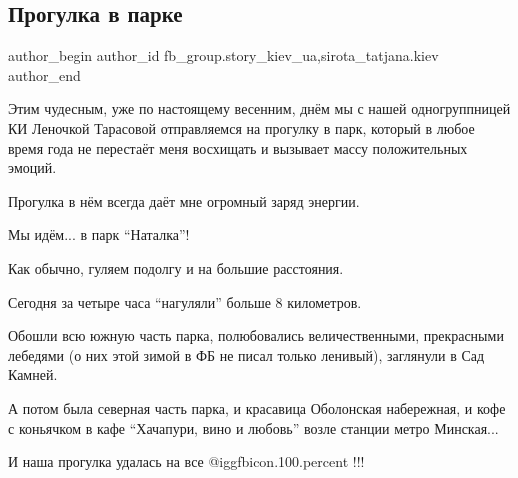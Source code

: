  
 
 
 
 
 
\subsection{Прогулка в парке}
\label{sec:21_02_2022.fb.fb_group.story_kiev_ua.2.progulka_v_parke}
 
\ifcmt
 author_begin
   author_id fb_group.story_kiev_ua,sirota_tatjana.kiev
 author_end
\fi

Этим чудесным, уже по настоящему весенним, днём мы с нашей одногруппницей КИ
Леночкой Тарасовой отправляемся на прогулку в парк, который в любое время года
не перестаёт меня восхищать и вызывает массу положительных эмоций.


Прогулка в нём всегда даёт мне огромный заряд энергии.

Мы идём... в парк \enquote{Наталка}!

Как обычно, гуляем подолгу и на большие расстояния.


Сегодня за четыре часа \enquote{нагуляли} больше 8 километров.


Обошли всю южную часть парка, полюбовались величественными, прекрасными
лебедями (о них этой зимой в ФБ не писал только ленивый), заглянули в Сад
Камней.


А потом была северная часть парка, и красавица Оболонская набережная, и кофе с
коньячком в кафе \enquote{Хачапури, вино и любовь} возле  станции метро
Минская...

И наша прогулка удалась на все  @igg{fbicon.100.percent} !!!

